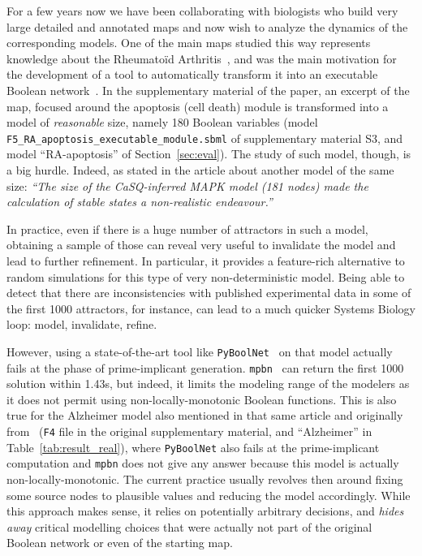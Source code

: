 \documentclass[preprint,12pt]{elsarticle}
\begin{document}
For a few years now we have been collaborating with biologists who build very large detailed and annotated maps and now wish to analyze the dynamics of the corresponding models.
One of the main maps studied this way represents knowledge about the Rheumatoïd Arthritis~\cite{singh2018computational}, and was the main motivation for the development of a tool to automatically transform it into an executable Boolean network~\cite{aghamiri2020automated}.
In the supplementary material of the paper, an excerpt of the map, focused around the apoptosis (cell death) module is transformed into a model of \emph{reasonable} size, namely 180 Boolean variables (model \verb|F5_RA_apoptosis_executable_module.sbml| of supplementary material S3, and model ``RA-apoptosis'' of Section~\ref{sec:eval}).
The study of such model, though, is a big hurdle.
Indeed, as stated in the article about another model of the same size:
\emph{``The size of the CaSQ-inferred MAPK model (181 nodes) made the calculation of stable states a non-realistic endeavour.''}

In practice, even if there is a huge number of attractors in such a model, obtaining a sample of those can reveal very useful to invalidate the model and lead to further refinement.
In particular, it provides a feature-rich alternative to random simulations for this type of very non-deterministic model.
Being able to detect that there are inconsistencies with published experimental data in some of the first 1000 attractors, for instance, can lead to a much quicker Systems Biology loop: model, invalidate, refine.

However, using a state-of-the-art tool like \texttt{PyBoolNet}~\cite{klarner2015computing} on that model actually fails at the phase of prime-implicant generation.
\texttt{mpbn}~\cite{Paulev2020} can return the first 1000 solution within 1.43s, but indeed, it limits the modeling range of the modelers as it does not permit using non-locally-monotonic Boolean functions.
This is also true for the Alzheimer model also mentioned in that same article and originally from~\cite{ogishima2016alzpathway} (\verb|F4| file in the original supplementary material, and ``Alzheimer'' in Table~\ref{tab:result_real}), where \texttt{PyBoolNet} also fails at the prime-implicant computation and \texttt{mpbn} does not give any answer because this model is actually non-locally-monotonic.
The current practice usually revolves then around fixing some source nodes to plausible values and reducing the model accordingly.
While this approach makes sense, it relies on potentially arbitrary decisions, and \emph{hides away} critical modelling choices that were actually not part of the original Boolean network or even of the starting map.
\end{document}
